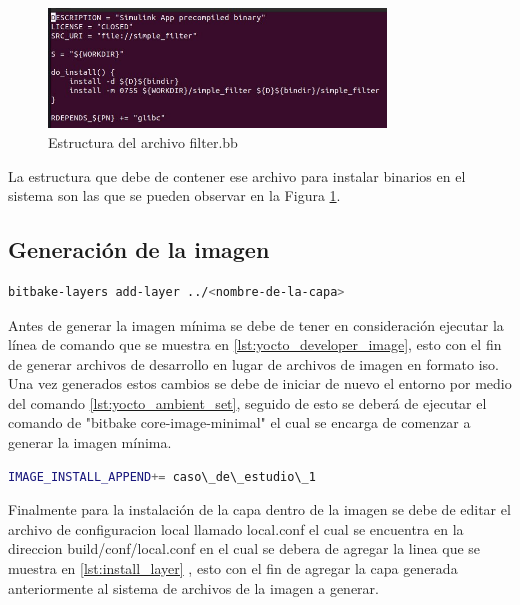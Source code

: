 \begin{figure}[h!]
    \centering
    \includegraphics[width=0.8\textwidth]{fig/especifico_2/bbfilestructure.jpg}
    \caption{Estructura del archivo filter.bb}
    \label{fig:estructura_archivo_bb}
\end{figure}

La estructura que debe de contener ese archivo para instalar binarios en el sistema son las que se pueden observar en la Figura \ref{fig:estructura_archivo_bb}.

\subsection{Generación de la imagen}\label{subsec:generacion_imagen_minima}

\begin{lstlisting}[language=bash, caption={Generar archivos de desarrollador, Yocto }, label=lst:yocto_developer_image]
    bitbake-layers add-layer ../<nombre-de-la-capa>
\end{lstlisting}

Antes de generar la imagen mínima se debe de tener en consideración ejecutar la línea de comando que se muestra en \ref{lst:yocto_developer_image}, esto con el fin de generar archivos de desarrollo en lugar de archivos de imagen en formato iso. Una vez generados estos cambios se debe de iniciar de nuevo el entorno por medio del comando \ref{lst:yocto_ambient_set}, seguido de esto se deberá de ejecutar el comando de "bitbake core-image-minimal" el cual se encarga de comenzar a generar la imagen mínima.

\begin{lstlisting}[language=bash, caption={Instalar la capa generada, Yocto }, label=lst:install_layer]
    IMAGE_INSTALL_APPEND+= caso\_de\_estudio\_1
\end{lstlisting}

Finalmente para la instalación de la capa dentro de la imagen se debe de editar el archivo de configuracion local llamado local.conf el cual se encuentra en la direccion build/conf/local.conf en el cual se debera de agregar la linea que se muestra en \ref{lst:install_layer} , esto con el fin de agregar la capa generada anteriormente al sistema de archivos de la imagen a generar.


